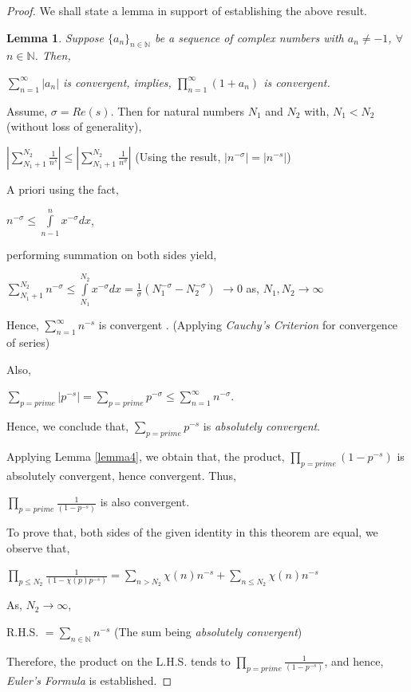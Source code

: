\documentclass[article,12pt]{elsarticle}
\newtheorem{lemma}[thm]{Lemma}
\begin{document}
	\begin{proof}
		We shall state a lemma in support of establishing the above result.
		\begin{lemma}\label{lemma4}
			Suppose $\{a_{n}\}_{n\in \mathbb{N}}$ be a sequence of \textit{complex numbers} with $a_{n}\neq -1$,  $\forall$ $ n\in \mathbb{N}$. Then,
			\begin{center}
				$\sum\limits_{n=1}^{\infty}{|a_{n}|}$ is convergent,     implies,     $\prod\limits_{n=1}^{\infty}{(1+a_{n})}$  is convergent.
			\end{center}
		\end{lemma}
		Assume, $\sigma=Re(s)$. Then for natural numbers $N_{1}$ and $N_{2}$ with, $N_{1}<N_{2}$ (without loss of generality), 
		\begin{center}
			$|\sum\limits_{N_{1}+1}^{N_{2}}\frac{1}{n^{s}}|\leq |\sum\limits_{N_{1}+1}^{N_{2}}\frac{1}{n^{\sigma}}|$ \hspace{40pt}  (Using the result, $|n^{-\sigma}|=|n^{-s}|$)
		\end{center}
		A priori using the fact, 
		\begin{center}
			$n^{-\sigma}\leq \int\limits_{n-1}^{n}{x^{-\sigma}}dx$,
		\end{center}
		performing summation on both sides yield,
		\begin{center}
			$\sum\limits_{N_{1}+1}^{N_{2}}n^{-\sigma}\leq  \int\limits_{N_{1}}^{N_{2}}{x^{-\sigma}}dx=\frac{1}{\sigma}(N_{1}^{-\sigma}-N_{2}^{-\sigma})$ $\longrightarrow 0$     as, $N_{1},N_{2}\rightarrow \infty$
		\end{center}
		Hence, $\sum\limits_{n=1}^{\infty}n^{-s}$ is convergent . (Applying \textit{Cauchy's Criterion} for convergence of series)
		
		Also,
		\begin{center} $\sum\limits_{p=prime}|p^{-s}|=\sum\limits_{p=prime}p^{-\sigma} \leq \sum\limits_{n=1}^{\infty}n^{-\sigma}$.
		\end{center}
		Hence, we conclude that, $\sum\limits_{p=prime}p^{-s}$ is \textit{absolutely convergent}.\par
		Applying Lemma \eqref{lemma4}, we obtain that, the product, $\prod\limits_{p=prime}(1-p^{-s})$ is absolutely convergent, hence convergent.
		Thus,
		\begin{center}
			$\prod\limits_{p=prime}\frac{1}{(1-p^{-s})}$ is also convergent.
		\end{center}
		To prove that, both sides of the given identity in this theorem are equal, we observe that,
		\begin{center}
			$\prod\limits_{p\leq N_{2}}\frac{1}{(1-\chi(p)p^{-s})}=\sum\limits_{n> N_{2}}\chi(n)n^{-s}+\sum\limits_{n\leq N_{2}}\chi(n)n^{-s}$
		\end{center}
		As, $N_{2}\longrightarrow \infty$,  
		\begin{center}
			R.H.S.    $=\sum\limits_{n\in \mathbb{N}}n^{-s}$ \hspace{40pt} (The sum being \textit{absolutely convergent})
		\end{center}
		Therefore, the product on the L.H.S. tends to $\prod\limits_{p=prime}\frac{1}{(1-p^{-s})}$, and hence, \textit{Euler's Formula} is established.
	\end{proof}
\end{document}
